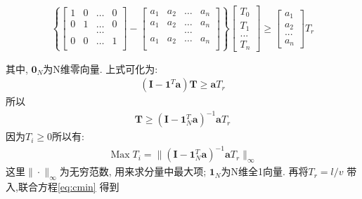   

    \begin{equation}     
        \left\{
            \left[                 
                \begin{array}{cccc}   
                1 & 0 & \dots& 0 \\  
                0 & 1  & \dots& 0 \\ 
                &&\dots&\\
                0&0&\dots&1\\
                \end{array}
            \right] 
            -
            \left[                 
            \begin{array}{cccc}   
                a_1 & a_2 & \dots& a_n \\ 
                a_1 & a_2  & \dots& a_n \\  
                &&\dots&\\
                a_1&a_2&\dots&a_n\\
            \end{array}
            \right]    
        \right\}   
        \left[
            \begin{array}{cccc}
             T_0\\
             T_1\\
             ... \\
             T_{n}
            \end{array}
        \right ]
        \geq
        \left[
            \begin{array}{cccc}
            a_{1}\\
            a_{2}\\
            ... \\
            a_{n}
            \end{array}
        \right ]
        T_r 
        \end{equation}

其中, $\textbf{0}_N$为N维零向量. 上式可化为:
\begin{eqnarray}
  (\textbf{I}- \textbf{1}^T\textbf{a} )\textbf{T} \geq \textbf{a} T_r
\end{eqnarray}
所以
\begin{eqnarray}
  \textbf{T} \geq   (\textbf{I}- \textbf{1}_N^T\textbf{a} )^{-1}\textbf{a} T_r
\end{eqnarray}
因为$T_i \geq 0$所以有:
\begin{eqnarray}
    \mathop{Max}T_i = \| (\textbf{I}- \textbf{1}_N^T\textbf{a} )^{-1}\textbf{a} T_r\|_{\infty}
\end{eqnarray}
这里$\|\cdot\|_\infty$为无穷范数, 用来求分量中最大项; $\textbf{1}_N$为N维全1向量. 再将$ T_r = l/v$ 带入,联合方程\ref{eq:cmin} 得到

